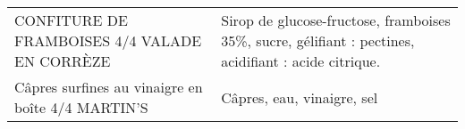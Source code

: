 \begin{longtable}{p{5cm}p{10cm}}
                                                            CONFITURE DE FRAMBOISES 4/4 VALADE EN CORRÈZE &                                                                                                                                                                                                                                                                                                                                                                                                                                                                                                                                                                                                                                                                                                                                                                                                                                                                                                                                     Sirop de glucose-fructose, framboises 35\%, sucre, gélifiant : pectines, acidifiant : acide citrique. \\
                                                        Câpres surfines au vinaigre en boîte 4/4 MARTIN'S &                                                                                                                                                                                                                                                                                                                                                                                                                                                                                                                                                                                                                                                                                                                                                                                                                                                                                                                                                                                                               Câpres, eau, vinaigre, sel \\

\end{longtable}
